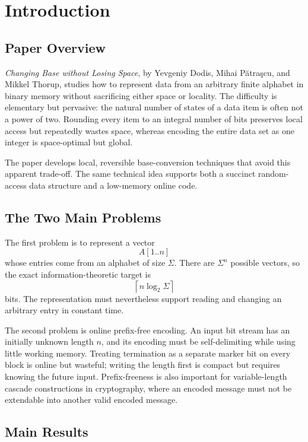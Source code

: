 \section{Introduction}

\subsection{Paper Overview}

\textit{Changing Base without Losing Space}, by Yevgeniy Dodis, Mihai
P\u{a}tra\c{s}cu, and Mikkel Thorup, studies how to represent data from an
arbitrary finite alphabet in binary memory without sacrificing either space
or locality. The difficulty is elementary but pervasive: the natural number
of states of a data item is often not a power of two. Rounding every item to
an integral number of bits preserves local access but repeatedly wastes
space, whereas encoding the entire data set as one integer is space-optimal
but global.

The paper develops local, reversible base-conversion techniques that avoid
this apparent trade-off. The same technical idea supports both a succinct
random-access data structure and a low-memory online code.

\subsection{The Two Main Problems}

The first problem is to represent a vector
\[
    A[1..n]
\]
whose entries come from an alphabet of size \(\Sigma\). There are
\(\Sigma^n\) possible vectors, so the exact information-theoretic target is
\[
    \left\lceil n\log_2\Sigma\right\rceil
\]
bits. The representation must nevertheless support reading and changing an
arbitrary entry in constant time.

The second problem is online prefix-free encoding. An input bit stream has
an initially unknown length \(n\), and its encoding must be self-delimiting
while using little working memory. Treating termination as a separate marker
bit on every block is online but wasteful; writing the length first is compact
but requires knowing the future input. Prefix-freeness is also important for
variable-length cascade constructions in cryptography, where an encoded
message must not be extendable into another valid encoded message.

\subsection{Main Results}

